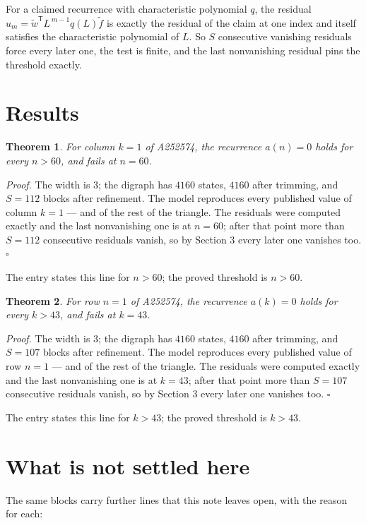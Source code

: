 \documentclass[11pt]{article}
\newtheorem{theorem}{Theorem}
\theoremstyle{definition}
\begin{document}
For a claimed recurrence with characteristic polynomial $q$, the residual $u_m = \tilde w^{\mathsf T}L^{\,m-1}q(L)\tilde f$ is exactly the residual of the claim at one index and itself satisfies the characteristic polynomial of $L$. So $S$ consecutive vanishing residuals force every later one, the test is finite, and the last nonvanishing residual pins the threshold exactly.

\section{Results}

\begin{theorem} For column $k = 1$ of A252574, the recurrence $a(n) = 0$ holds for every $n > 60$, and fails at $n = 60$.\end{theorem}

{\itshape Proof.} The width is $3$; the digraph has $4160$ states, $4160$ after trimming, and $S = 112$ blocks after refinement. The model reproduces every published value of column $k = 1$ --- and of the rest of the triangle. The residuals were computed exactly and the last nonvanishing one is at $n = 60$; after that point more than $S = 112$ consecutive residuals vanish, so by Section 3 every later one vanishes too. $\square$

The entry states this line for $n > 60$; the proved threshold is $n > 60$.

\begin{theorem} For row $n = 1$ of A252574, the recurrence $a(k) = 0$ holds for every $k > 43$, and fails at $k = 43$.\end{theorem}

{\itshape Proof.} The width is $3$; the digraph has $4160$ states, $4160$ after trimming, and $S = 107$ blocks after refinement. The model reproduces every published value of row $n = 1$ --- and of the rest of the triangle. The residuals were computed exactly and the last nonvanishing one is at $k = 43$; after that point more than $S = 107$ consecutive residuals vanish, so by Section 3 every later one vanishes too. $\square$

The entry states this line for $k > 43$; the proved threshold is $k > 43$.

\section{What is not settled here}

The same blocks carry further lines that this note leaves open, with the reason for each:
\end{document}
